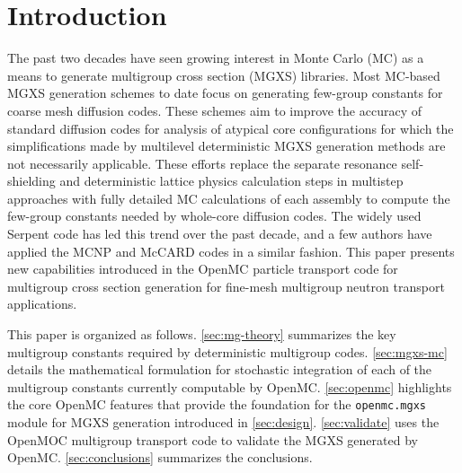 \section{Introduction}
\label{sec:intro}

The past two decades have seen growing interest in Monte Carlo (MC) as a means to generate multigroup cross section (MGXS) libraries. Most MC-based MGXS generation schemes to date focus on generating few-group constants for coarse mesh diffusion codes. These schemes aim to improve the accuracy of standard diffusion codes for analysis of atypical core configurations for which the simplifications made by multilevel deterministic MGXS generation methods are not necessarily applicable. These efforts replace the separate resonance self-shielding and deterministic lattice physics calculation steps in multistep approaches with fully detailed MC calculations of each assembly to compute the few-group constants needed by whole-core diffusion codes. The widely used Serpent code\cite{leppanen2015serpent} has led this trend over the past decade, and a few authors have applied the MCNP\cite{pounders2006stochastically} and McCARD\cite{shim2008generation} codes in a similar fashion. This paper presents new capabilities introduced in the OpenMC\cite{romano2015openmc} particle transport code for multigroup cross section generation for fine-mesh multigroup neutron transport applications.

This paper is organized as follows. \cref{sec:mg-theory} summarizes the key multigroup constants required by deterministic multigroup codes. \cref{sec:mgxs-mc} details the mathematical formulation for stochastic integration of each of the multigroup constants currently computable by OpenMC. \cref{sec:openmc} highlights the core OpenMC features that provide the foundation for the \texttt{openmc.mgxs} module for MGXS generation introduced in \cref{sec:design}. \cref{sec:validate} uses the OpenMOC\cite{boyd2014openmoc} multigroup transport code to validate the MGXS generated by OpenMC. \cref{sec:conclusions} summarizes the conclusions.
